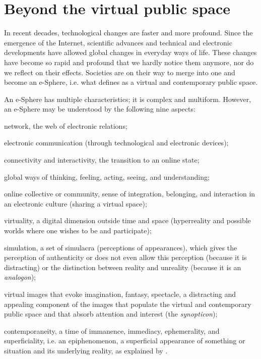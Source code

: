 \documentclass[english]{textolivre}
\begin{document}
\section{Beyond the virtual public space}

In recent decades, technological changes are faster and more profound. Since the emergence of the Internet, scientific advances and technical and electronic developments have allowed global changes in everyday ways of life. These changes have become so rapid and profound that we hardly notice them anymore, nor do we reflect on their effects. Societies are on their way to merge into one and become an e-Sphere, i.e. what \textcite[p.~1]{pelton_e-sphere:_2000} defines as a virtual and contemporary public space.

An e-Sphere has multiple characteristics; it is complex and multiform. However, an e-Sphere may be understood by the following nine aspects: 
\begin{enumerate*}[label=\alph*)]
\item network, the web of electronic relations;
\item electronic communication (through technological and electronic devices);
\item connectivity and interactivity, the transition to an online state;
\item global ways of thinking, feeling, acting, seeing, and understanding;
\item online collective or community, sense of integration, belonging, and interaction in an electronic culture (sharing a virtual space);
\item virtuality, a digital dimension outside time and space (hyperreality and possible worlds where one wishes to be and participate);
\item simulation, a set of simulacra (perceptions of appearances), which gives the perception of authenticity or does not even allow this perception (because it is distracting) or the distinction between reality and unreality (because it is an \textit{analogon});
\item virtual images that evoke imagination, fantasy, spectacle, a distracting and appealing component of the images that populate the virtual and contemporary public space and that absorb attention and interest (the \textit{synopticon});
\item contemporaneity, a time of immanence, immediacy, ephemerality, and superficiality, i.e. an epiphenomenon, a superficial appearance of something or situation and its underlying reality, as explained by \textcite[p.~89]{bruce_sage_2006}.
\end{enumerate*}
\end{document}

